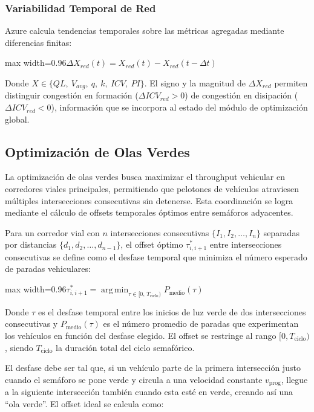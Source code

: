 \documentclass[12pt,a4paper,oneside]{report}
\newenvironment{centeredmath}
  {\begin{center}\begin{adjustbox}{max width=0.96\linewidth}\(\displaystyle}
  {\)\end{adjustbox}\end{center}}
\begin{document}
\subsubsection{Variabilidad Temporal de Red}

Azure calcula tendencias temporales sobre las métricas agregadas mediante diferencias finitas:

\begin{centeredmath}
\Delta X_{red}(t) = X_{red}(t) - X_{red}(t - \Delta t)
\end{centeredmath}

Donde \(X \in \{QL,\ V_{avg},\ q,\ k,\ ICV,\ PI\}\). El signo y la magnitud de \(\Delta X_{red}\) permiten distinguir congestión en formación (\(\Delta ICV_{red} > 0\)) de congestión en disipación (\(\Delta ICV_{red} < 0\)), información que se incorpora al estado del módulo de optimización global.

\subsection{Optimización de Olas Verdes}\label{optimizaciuxf3n-de-olas-verdes}

La optimización de olas verdes busca maximizar el throughput vehicular en corredores viales principales, permitiendo que pelotones de vehículos atraviesen múltiples intersecciones consecutivas sin detenerse. Esta coordinación se logra mediante el cálculo de offsets temporales óptimos entre semáforos adyacentes.

Para un corredor vial con \(n\) intersecciones consecutivas \(\{I_1, I_2, \ldots, I_n\}\) separadas por distancias \(\{d_1, d_2, \ldots, d_{n-1}\}\), el offset óptimo \(\tau_{i,i+1}^{*}\) entre intersecciones consecutivas se define como el desfase temporal que minimiza el número esperado de paradas vehiculares:

\begin{centeredmath}
\tau_{i,i+1}^{*} = \operatorname*{arg\,min}_{\tau \in [0,\,T_{\text{ciclo}})} P_{\text{medio}}(\tau)
\end{centeredmath}

Donde \(\tau\) es el desfase temporal entre los inicios de luz verde de dos intersecciones consecutivas y \(P_{\text{medio}}(\tau)\) es el número promedio de paradas que experimentan los vehículos en función del desfase elegido. El offset se restringe al rango \([0, T_{\text{ciclo}})\), siendo \(T_{\text{ciclo}}\) la duración total del ciclo semafórico.

El desfase debe ser tal que, si un vehículo parte de la primera intersección justo cuando el semáforo se pone verde y circula a una velocidad constante \(v_{\text{prog}}\), llegue a la siguiente intersección también cuando esta esté en verde, creando así una ``ola verde''. El offset ideal se calcula como:
\end{document}
